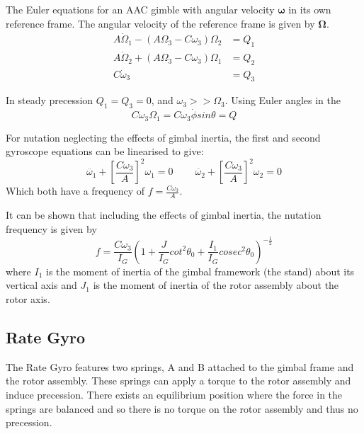 \documentclass[8pt]{article}
\begin{document}
The Euler equations for an AAC gimble with angular velocity $\bm{\omega}$ in its own reference frame.
The angular velocity of the reference frame is given by $\bm{\Omega}$.
\begin{align}
    A\dot{\Omega}_1 - (A\Omega_3 - C \omega_3) \Omega_2 &= Q_1 \tag{A1}\\
    A\dot{\Omega}_2 + (A\Omega_3 - C\omega_3) \Omega_1 &= Q_2 \tag{A2} \label{eq:A2} \\
    C\dot{\omega}_3 &= Q_3 \tag{A3}
\end{align}

In steady precession $Q_1 = Q_3 = 0$, and $\omega_3 >> \Omega_3$.
Using Euler angles in the 
\begin{equation}
    C\omega_3 \Omega_1 = C\omega_3 \dot{\phi} sin \theta = Q \tag{A4} \label{eq:A4}
\end{equation}

For nutation neglecting the effects of gimbal inertia, the first and second gyroscope equations can be linearised to give:
\begin{equation}
    \ddot{\omega_1} + \left[ \frac{C\omega_3}{A} \right]^2 \omega_1 = 0 \;\;\;\;\;\;\;\; \ddot{\omega_2} + \left[ \frac{C\omega_3}{A} \right]^2 \omega_2 = 0 \tag{A5}
\end{equation}
Which both have a frequency of $ f = \frac{C\omega_3}{A} $.

It can be shown that including the effects of gimbal inertia, the nutation frequency is given by
\begin{equation}
    f = \frac{C\omega_3}{I_G} \left( 1 + \frac{J}{I_G}cot^2\theta_0 + \frac{I_1}{I_G}cosec^2\theta_0 \right)^{-\frac{1}{2}} \tag{A7} \label{eq:A7}
\end{equation}
where $I_1$ is the moment of inertia of the gimbal framework (the stand) about its vertical axis
and $J_1$ is the moment of inertia of the rotor assembly about the rotor axis.

\subsection{Rate Gyro}

The Rate Gyro features two springs, A and B attached to the gimbal frame and the rotor assembly.
These springs can apply a torque to the rotor assembly and induce precession.
There exists an equilibrium position where the force in the springs are balanced and so there is no torque on the rotor assembly and thus no precession.
\end{document}
